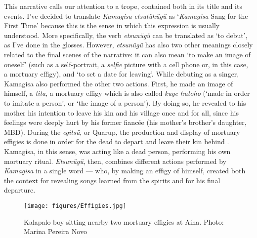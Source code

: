 \documentclass[output=paper,
modfonts,nonflat
]{langsci/langscibook}
\begin{document}
    This narrative calls our attention to a trope, contained both in its title and its events. I've decided to translate \textit{Kamagisa} \textit{etsutühügü} as ‘\textit{Kamagisa} Sang for the First Time' because this is the sense in which this expression is usually understood. More specifically, the verb \textit{etsunügü} can be translated as ‘to debut', as I've done in the glosses. However, \textit{etsunügü} has also two other meanings closely related to the final scenes of the narrative: it can also mean ‘to make an image of oneself' (such as a self-portrait, a \textit{selfie} picture with a cell phone or, in this case, a mortuary effigy), and ‘to set a date for leaving'. While debuting as a singer, Kamagisa also performed the other two actions. First, he made an image of himself, a \textit{tita}, a mortuary effigy which is also called \textit{kuge hutoho} (‘made in order to imitate a person', or ‘the image of a person'). By doing so, he revealed to his mother his intention to leave his kin and his village once and for all, since his feelings were deeply hurt by his former fiancée (his mother's brother's daughter, MBD). During the \textit{egitsü}, or Quarup, the production and display of mortuary effigies is done in order for the dead to depart and leave their kin behind \citep{Guerreiro2011,Guerreiro2015}. Kamagisa, in this sense, was acting like a dead person, performing his own mortuary ritual. \textit{Etsunügü}, then, combines different actions performed by \textit{Kamagisa} in a single word — who, by making an effigy of himself, created both the context for revealing songs learned from the spirits and for his final departure.
    
\begin{figure}[h!]
  \texttt{[image: figures/Effigies.jpg]}
  \caption{Kalapalo boy sitting nearby two mortuary effigies at Aiha. Photo: Marina Pereira Novo}
\end{figure}
    
\end{document}
